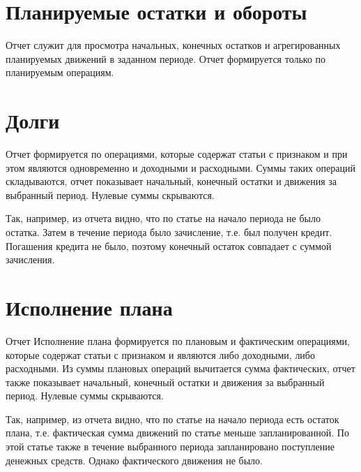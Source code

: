 \documentclass[a4paper,10pt,russian]{sphinxmanual}
\begin{document}
\noindent{}
\noindent{}
\noindent{}


\section{Планируемые остатки и обороты}
\label{\detokenize{reports:id6}}
\sphinxAtStartPar
Отчет служит для просмотра начальных, конечных остатков и агрегированных планируемых движений в заданном периоде. Отчет формируется
только по планируемым операциям.


\section{Долги}
\label{\detokenize{reports:id7}}
\sphinxAtStartPar
Отчет формируется по операциями, которые содержат статьи с признаком  и при этом являются
одновременно и доходными и расходными. Суммы таких операций складываются, отчет показывает начальный, конечный
остатки и движения за выбранный период. Нулевые суммы скрываются.

\sphinxAtStartPar
Так, например, из отчета видно, что по статье  на начало периода не было остатка. Затем
в течение периода было зачисление, т.е. был получен кредит. Погашения кредита не было, поэтому конечный
остаток совпадает с суммой зачисления.


\section{Исполнение плана}
\label{\detokenize{reports:id8}}
\sphinxAtStartPar
Отчет Исполнение плана формируется по плановым и фактическим операциями, которые содержат статьи с
признаком  и являются либо доходными, либо расходными. Из суммы плановых операций вычитается
сумма фактических, отчет также показывает начальный, конечный остатки и движения за выбранный период.
Нулевые суммы скрываются.

\sphinxAtStartPar
Так, например, из отчета видно, что по статье  на начало периода есть остаток плана, т.е. фактическая сумма
движений по статье  меньше запланированной. По этой статье также в течение выбранного периода запланировано
поступление денежных средств. Однако фактического движения не было.
\end{document}
